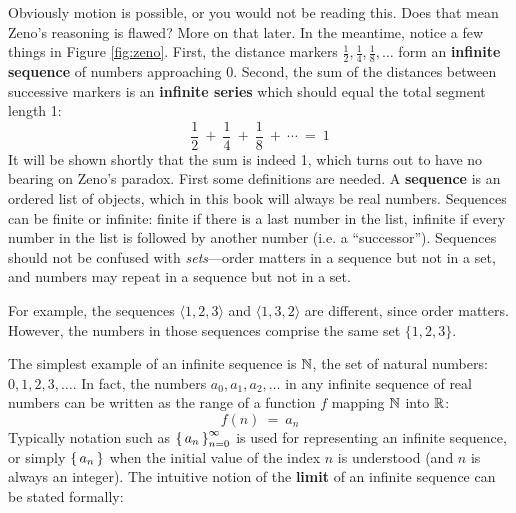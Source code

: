 Obviously motion is possible, or you would not be reading this. Does that mean
Zeno's reasoning is flawed? More on that later. In the meantime, notice a
few things in Figure \ref{fig:zeno}. First, the distance markers
$\frac{1}{2},\frac{1}{4},\frac{1}{8},\ldots$ form an \textbf{infinite sequence}
of numbers approaching 0. Second, the sum of the distances between successive
markers is an \textbf{infinite series} which should equal the total segment
length 1:
\[
\frac{1}{2} ~+~ \frac{1}{4} ~+~ \frac{1}{8} ~+~ \cdots ~=~ 1
\]
It will be shown shortly that the sum is indeed 1, which turns out to have no
bearing on Zeno's paradox. First some definitions are needed.
\newpage
A \textbf{sequence} is an ordered list of objects, which in this book will
always be real numbers. Sequences can be finite or infinite:
finite if there is a last number in the list, infinite if every number in the
list is followed by another number (i.e. a ``successor''). Sequences should not
be confused with \emph{sets}---order matters in a sequence but not in a
set, and numbers may repeat in a sequence but not in a set.

For example, the sequences $\langle 1,2,3\rangle$ and $\langle 1,3,2\rangle$ are
different, since order matters. However, the numbers in those sequences comprise
the same set $\lbrace 1,2,3\rbrace$.

The simplest example of an infinite sequence is $\mathbb{N}$, the set
of natural numbers: $0,1,2,3,\ldots$. In fact, the numbers $a_0,a_1,a_2,\ldots$
in any infinite sequence of real numbers can be written as the range of a
function $f$ mapping $\mathbb{N}$ into $\mathbb{R}$:
\begin{equation}\label{eqn:seqfcn}
f(n) ~=~ a_n
\end{equation}
Typically notation such as $\left\lbrace\mspace{3mu}a_n\mspace{3mu}\right\rbrace_{n=0}^{\infty}$ is used for representing
an infinite sequence, or simply $\left\lbrace\mspace{3mu}a_n\mspace{3mu}\right\rbrace$ when the initial value of the index
$n$ is understood (and $n$ is always an integer).
The intuitive notion of the \textbf{limit} of an infinite sequence can be stated
formally:


